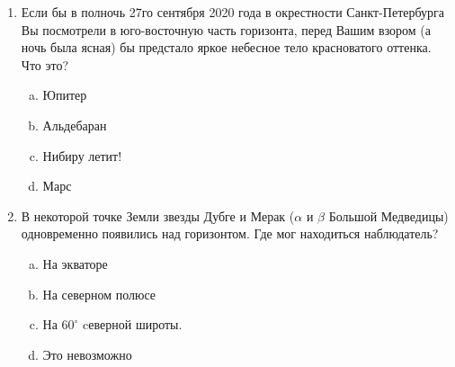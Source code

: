 \documentclass{trnotes}
\begin{document}
\begin{enumerate}
    \vspace*{7em}

  \item Если бы в полночь 27го сентября 2020 года в окрестности Санкт-Петербурга Вы посмотрели в юго-восточную часть горизонта, перед Вашим взором (а ночь была ясная) бы предстало яркое небесное тело красноватого оттенка. Что это?
    \begin{enumerate}[a)]
      \itemsep=0pt\parsep=0pt
      \item Юпитер
      \item Альдебаран
      \item Нибиру летит!
      \item Марс
    \end{enumerate}
  \item В некоторой точке Земли звезды Дубге и Мерак ($α$ и $β$ Большой Медведицы) одновременно появились над горизонтом. Где мог находиться наблюдатель? 
    \begin{enumerate}[a)]
      \itemsep=0pt\parsep=0pt
      \item На экваторе
      \item На северном полюсе
      \item На $60^\circ$ cеверной широты.
      \item Это невозможно
    \end{enumerate}

\end{enumerate}
\end{document}
